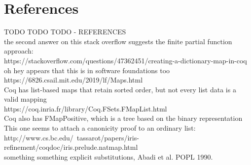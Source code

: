 \documentclass[nonacm]{acmart}
\theoremstyle{slplain}
\numberwithin{thm}{section}
\begin{document}
\section{References}
\label{sec:References}
TODO TODO TODO - REFERENCES
\\
the second answer on this stack overflow suggests the finite partial function approach:
\\
https://stackoverflow.com/questions/47362451/creating-a-dictionary-map-in-coq
\\
oh hey appears that this is in software foundations too
\\
https://6826.csail.mit.edu/2019/lf/Maps.html
\\
Coq has list-based maps that retain sorted order, but not every list data is a valid mapping
\\
https://coq.inria.fr/library/Coq.FSets.FMapList.html
\\
Coq also has FMapPositive, which is a tree based on the binary representation
\\
This one seems to attach a canonicity proof to an ordinary list:
\\
http://www.cs.bc.edu/~tassarot/papers/iris-refinement/coqdoc/iris.prelude.natmap.html
\\
something something explicit substitutions, Abadi et al. POPL 1990.

\clearpage
%


% 
\end{document}
